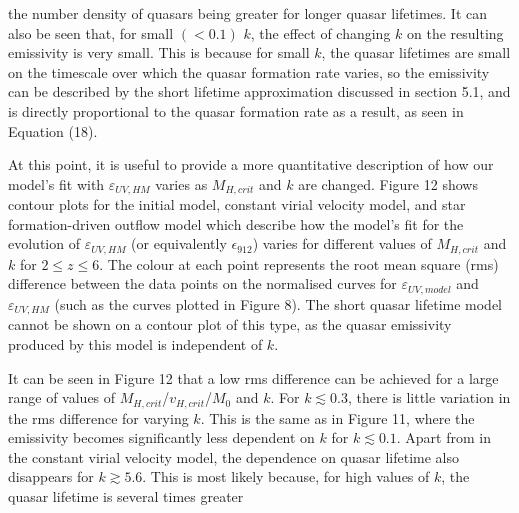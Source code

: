 \documentclass[12pt, twocolumn]{report}%
\begin{document}
\twocolumngrid


\noindent the number density of quasars being greater for longer quasar lifetimes. It can also be seen that, for small $(<0.1)$ $k$, the effect of changing $k$ on the resulting emissivity is very small. This is because for small $k$, the quasar lifetimes are small on the timescale over which the quasar formation rate varies, so the emissivity can be described by the short lifetime approximation discussed in section 5.1, and is directly proportional to the quasar formation rate as a result, as seen in Equation (18).\par

At this point, it is useful to provide a more quantitative description of how our model's fit with $\varepsilon_{UV,HM}$ varies as $M_{H,crit}$ and $k$ are changed. Figure 12 shows contour plots for the initial model, constant virial velocity model, and star formation-driven outflow model which describe how the model's fit for the evolution of $\varepsilon_{UV,HM}$ (or equivalently $\epsilon_{912}$) varies for different values of $M_{H,crit}$ and $k$ for $2\leq z\leq6$. The colour at each point represents the root mean square (rms) difference between the data points on the normalised curves for $\varepsilon_{UV,model}$ and $\varepsilon_{UV,HM}$ (such as the curves plotted in Figure 8). The short quasar lifetime model cannot be shown on a contour plot of this type, as the quasar emissivity produced by this model is independent of $k$.\par

It can be seen in Figure 12 that a low rms difference can be achieved for a large range of values of $M_{H,crit}$/$v_{H,crit}$/$M_0$ and $k$. For $k\lesssim0.3$, there is little variation in the rms difference for varying $k$. This is the same as in Figure 11, where the emissivity becomes significantly less dependent on $k$ for $k\lesssim0.1$. Apart from in the constant virial velocity model, the dependence on quasar lifetime also disappears for $k\gtrsim5.6$. This is most likely because, for high values of $k$, the quasar lifetime is several times greater

\onecolumngrid
\end{document}
